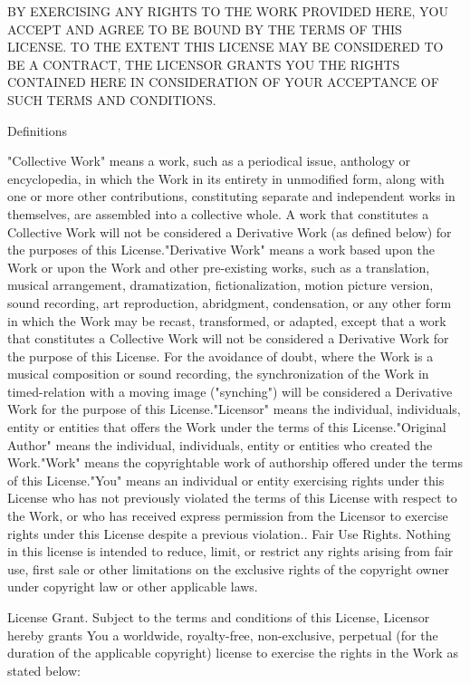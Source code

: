 BY EXERCISING ANY RIGHTS TO THE WORK PROVIDED HERE, YOU ACCEPT AND AGREE TO BE BOUND BY THE TERMS OF THIS LICENSE. TO THE EXTENT THIS LICENSE MAY BE CONSIDERED TO BE A CONTRACT, THE LICENSOR GRANTS YOU THE RIGHTS CONTAINED HERE IN CONSIDERATION OF YOUR ACCEPTANCE OF SUCH TERMS AND CONDITIONS.


\begin{DoxyEnumerate}
\item Definitions
\end{DoxyEnumerate}

"{}\+Collective Work"{} means a work, such as a periodical issue, anthology or encyclopedia, in which the Work in its entirety in unmodified form, along with one or more other contributions, constituting separate and independent works in themselves, are assembled into a collective whole. A work that constitutes a Collective Work will not be considered a Derivative Work (as defined below) for the purposes of this License."{}\+Derivative Work"{} means a work based upon the Work or upon the Work and other pre-\/existing works, such as a translation, musical arrangement, dramatization, fictionalization, motion picture version, sound recording, art reproduction, abridgment, condensation, or any other form in which the Work may be recast, transformed, or adapted, except that a work that constitutes a Collective Work will not be considered a Derivative Work for the purpose of this License. For the avoidance of doubt, where the Work is a musical composition or sound recording, the synchronization of the Work in timed-\/relation with a moving image ("{}synching"{}) will be considered a Derivative Work for the purpose of this License."{}\+Licensor"{} means the individual, individuals, entity or entities that offers the Work under the terms of this License."{}\+Original Author"{} means the individual, individuals, entity or entities who created the Work."{}\+Work"{} means the copyrightable work of authorship offered under the terms of this License."{}\+You"{} means an individual or entity exercising rights under this License who has not previously violated the terms of this License with respect to the Work, or who has received express permission from the Licensor to exercise rights under this License despite a previous violation.. Fair Use Rights. Nothing in this license is intended to reduce, limit, or restrict any rights arising from fair use, first sale or other limitations on the exclusive rights of the copyright owner under copyright law or other applicable laws.


\begin{DoxyEnumerate}
\item License Grant. Subject to the terms and conditions of this License, Licensor hereby grants You a worldwide, royalty-\/free, non-\/exclusive, perpetual (for the duration of the applicable copyright) license to exercise the rights in the Work as stated below\+:
\end{DoxyEnumerate}

